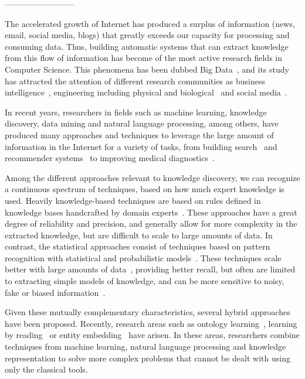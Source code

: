 --------------------------

The accelerated growth of Internet has produced a surplus of information (news, email,
social media, blogs) that greatly exceeds our capacity for processing and consuming data.
Thus, building automatic systems that can extract knowledge from this flow of information has
become of the most active research fields in Computer Science. This phenomena has been
dubbed Big Data~\cite{bigdata}, and its study has attracted the attention of different 
research communities 
as business intelligence~\cite{chen2012business}, engineering including physical and 
biological~\cite{wu2014data} and social media~\cite{shah2015big}.

In recent years, researchers in fields such as machine learning, knowledge discovery, data mining and
natural language processing, among others, have produced many approaches and techniques to
leverage the large amount of information in the Internet for a variety of tasks, from
building search~\cite{google} and recommender systems~\cite{youtube} 
to improving medical diagnostics~\cite{watson}.

Among the different approaches relevant to knowledge discovery, we can recognize a
continuous spectrum of techniques, based on how much expert knowledge is used. 
Heavily knowledge-based techniques are based 
on rules defined in knowledge bases handcrafted by domain experts~\cite{chandrasekaran1986generic}. 
These approaches have a great degree
of reliability and precision, and generally allow for more complexity in the extracted knowledge,
but are difficult to scale to large amounts of data.
In contrast, the statistical approaches consist of techniques based on pattern recognition with statistical
and probabilistic models~\cite{kevin2012machine}. These techniques scale better with large amounts of data~\cite{le2013building}, 
providing better recall, but often are limited to extracting simple models of knowledge,
and can be more sensitive to noisy, fake or biased information~\cite{bolukbasi2016man}.

Given these mutually complementary characteristics, several hybrid approaches have been proposed.
Recently, research areas such as ontology learning~\cite{cimiano2009ontology},
learning by reading~\cite{barker2007learning} or entity embedding~\cite{hu2015entity} have arisen.
In these areas, researchers combine techniques from machine learning, natural language
processing and knowledge representation to solve more complex problems that cannot
be dealt with using only the classical tools.

